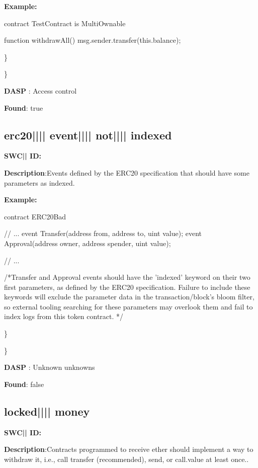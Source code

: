 \documentclass{article}
\begin{document}
\textbf{Example:} 
\begin{ffcode} 

contract TestContract is MultiOwnable {

  function withdrawAll(){
    msg.sender.transfer(this.balance);
  }
}

\end{ffcode} 
\} 

\} 

\textbf{DASP} : Access control

\textbf{Found}: true

\subsection{erc20{||\textunderscore|| }event{||\textunderscore|| }not{||\textunderscore|| }indexed} 
\textbf{SWC{|\textunderscore| }ID:} 

\textbf{Description}:Events defined by the ERC20 specification that should have some parameters as indexed.


\textbf{Example:} 
\begin{ffcode} 

contract ERC20Bad {
    // ...
    event Transfer(address from, address to, uint value);
    event Approval(address owner, address spender, uint value);

    // ...
}

 /*Transfer and Approval events should have the 'indexed' keyword on their two first parameters, as defined by the ERC20 specification. Failure to include these keywords will exclude the parameter data in the transaction/block's bloom filter, so external tooling searching for these parameters may overlook them and fail to index logs from this token contract. */ 

\end{ffcode} 
\} 

\} 

\textbf{DASP} : Unknown unknowns

\textbf{Found}: false

\subsection{locked{||\textunderscore|| }money} 
\textbf{SWC{|\textunderscore| }ID:} 

\textbf{Description}:Contracts programmed to receive ether should implement a way to withdraw it, i.e., call transfer (recommended), send, or call.value at least once..
\end{document}
